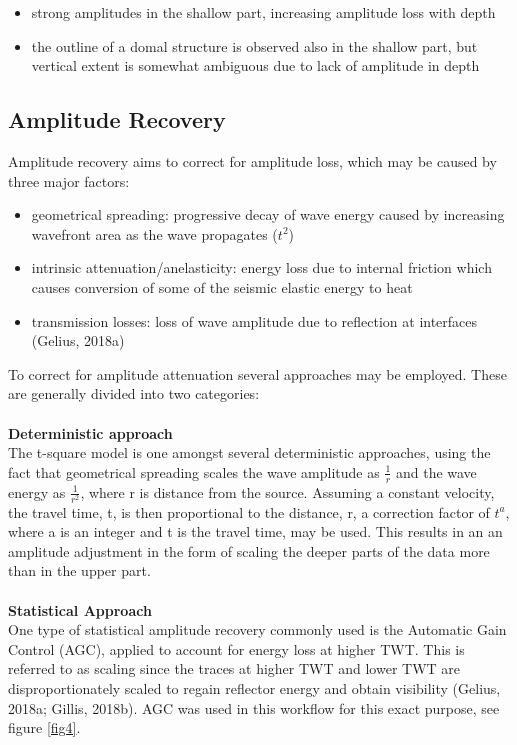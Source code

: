 \documentclass[10pt,a4paper]{article}
\begin{document}
\begin{itemize}
    \item strong amplitudes in the shallow part, increasing amplitude loss with depth
    \item the outline of a domal structure is observed also in the shallow part, but vertical extent is somewhat ambiguous due to lack of amplitude in depth
\end{itemize}

\subsection{Amplitude Recovery}

Amplitude recovery aims to correct for amplitude loss, which may be caused by three major factors:

\begin{itemize}
    \item geometrical spreading: progressive decay of wave energy caused by increasing wavefront area as the wave propagates ($t^2$)
    \item intrinsic attenuation/anelasticity: energy loss due to internal friction which causes conversion of some of the seismic elastic energy to heat
    \item transmission losses: loss of wave amplitude due to reflection at interfaces (Gelius, 2018a)
\end{itemize}

\noindent To correct for amplitude attenuation several approaches may be employed. These are generally divided into two categories:
\\
\\
{\bf Deterministic approach}
\\
The t-square model is one amongst several deterministic approaches, using the fact that geometrical spreading scales the wave amplitude as $\frac{1}{r}$ and the wave energy as $\frac{1}{r^2}$, where r is distance from the source. Assuming a constant velocity, the travel time, t, is then proportional to the distance, r, a correction factor of $t^a$, where a is an integer and t is the travel time, may be used. This results in an an amplitude adjustment in the form of scaling the deeper parts of the data more than in the upper part.
\\
\\
{\bf Statistical Approach}
\\
One type of statistical amplitude recovery commonly used is the Automatic Gain Control (AGC), applied to account for energy loss at higher TWT. This is referred to as scaling since the traces at higher TWT and lower TWT are disproportionately scaled to regain reflector energy and obtain visibility (Gelius, 2018a; Gillis, 2018b). AGC was used in this workflow for this exact purpose, see figure \ref{fig4}.
\end{document}
